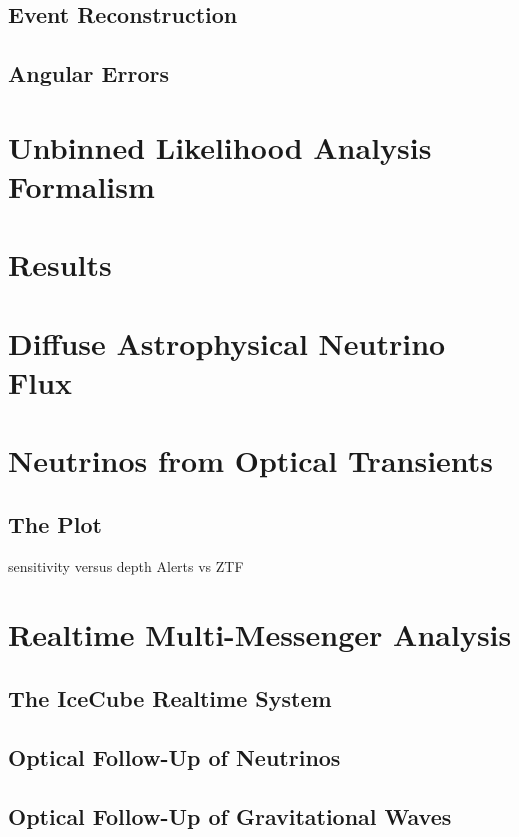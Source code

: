 \documentclass[]{article}
\begin{document}
\subsection{Event Reconstruction}
\subsection{Angular Errors}
\section{Unbinned Likelihood Analysis Formalism}

\section{Results}
\section{Diffuse Astrophysical Neutrino Flux}

\section{Neutrinos from Optical Transients}
\subsection{The Plot}
sensitivity versus depth
Alerts vs ZTF

\section{Realtime Multi-Messenger Analysis}
\subsection{The IceCube Realtime System}
\subsection{Optical Follow-Up of Neutrinos}

\subsection{Optical Follow-Up of Gravitational Waves}
\end{document}

